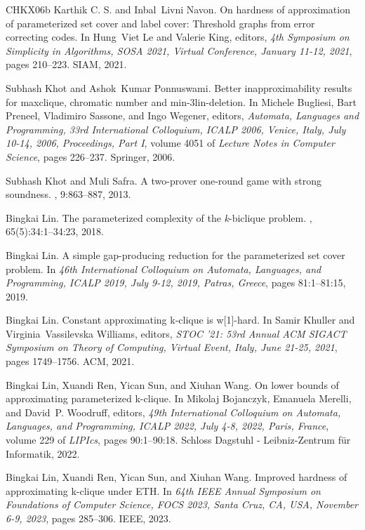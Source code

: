 \documentclass[10pt,a4paper]{article}
\begin{document}
\begin{thebibliography}{CHKX06b}
{Karthik {C. S.}} and Inbal~Livni Navon.
\newblock On hardness of approximation of parameterized set cover and label
  cover: Threshold graphs from error correcting codes.
\newblock In Hung~Viet Le and Valerie King, editors, {\em 4th Symposium on
  Simplicity in Algorithms, {SOSA} 2021, Virtual Conference, January 11-12,
  2021}, pages 210--223. {SIAM}, 2021.

Subhash Khot and Ashok~Kumar Ponnuswami.
\newblock Better inapproximability results for maxclique, chromatic number and
  min-3lin-deletion.
\newblock In Michele Bugliesi, Bart Preneel, Vladimiro Sassone, and Ingo
  Wegener, editors, {\em Automata, Languages and Programming, 33rd
  International Colloquium, {ICALP} 2006, Venice, Italy, July 10-14, 2006,
  Proceedings, Part {I}}, volume 4051 of {\em Lecture Notes in Computer
  Science}, pages 226--237. Springer, 2006.

Subhash Khot and Muli Safra.
\newblock A two-prover one-round game with strong soundness.
, 9:863--887, 2013.

Bingkai Lin.
\newblock The parameterized complexity of the \emph{k}-biclique problem.
, 65(5):34:1--34:23, 2018.

Bingkai Lin.
\newblock A simple gap-producing reduction for the parameterized set cover
  problem.
\newblock In {\em 46th International Colloquium on Automata, Languages, and
  Programming, {ICALP} 2019, July 9-12, 2019, Patras, Greece}, pages
  81:1--81:15, 2019.

Bingkai Lin.
\newblock Constant approximating k-clique is w[1]-hard.
\newblock In Samir Khuller and Virginia~Vassilevska Williams, editors, {\em
  {STOC} '21: 53rd Annual {ACM} {SIGACT} Symposium on Theory of Computing,
  Virtual Event, Italy, June 21-25, 2021}, pages 1749--1756. {ACM}, 2021.

Bingkai Lin, Xuandi Ren, Yican Sun, and Xiuhan Wang.
\newblock On lower bounds of approximating parameterized k-clique.
\newblock In Mikolaj Bojanczyk, Emanuela Merelli, and David~P. Woodruff,
  editors, {\em 49th International Colloquium on Automata, Languages, and
  Programming, {ICALP} 2022, July 4-8, 2022, Paris, France}, volume 229 of {\em
  LIPIcs}, pages 90:1--90:18. Schloss Dagstuhl - Leibniz-Zentrum f{\"{u}}r
  Informatik, 2022.

Bingkai Lin, Xuandi Ren, Yican Sun, and Xiuhan Wang.
\newblock Improved hardness of approximating k-clique under {ETH}.
\newblock In {\em 64th {IEEE} Annual Symposium on Foundations of Computer
  Science, {FOCS} 2023, Santa Cruz, CA, USA, November 6-9, 2023}, pages
  285--306. {IEEE}, 2023.


\end{thebibliography}
\end{document}
